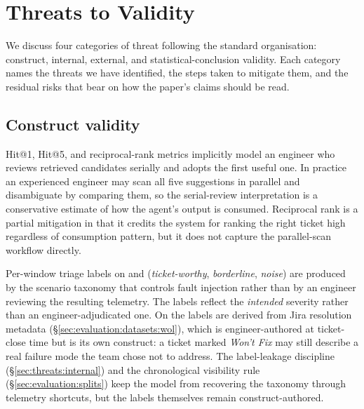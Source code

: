 
\section{Threats to Validity}
\label{sec:threats}

We discuss four categories of threat following the standard organisation: construct, internal, external, and statistical-conclusion validity. Each category names the threats we have identified, the steps taken to mitigate them, and the residual risks that bear on how the paper's claims should be read.

\subsection{Construct validity}
\label{sec:threats:construct}

 Hit@1, Hit@5, and reciprocal-rank metrics implicitly model an engineer who reviews retrieved candidates serially and adopts the first useful one. In practice an experienced engineer may scan all five suggestions in parallel and disambiguate by comparing them, so the serial-review interpretation is a conservative estimate of how the agent's output is consumed. Reciprocal rank is a partial mitigation in that it credits the system for ranking the right ticket high regardless of consumption pattern, but it does not capture the parallel-scan workflow directly.

 Per-window triage labels on \dsob{} and \dsotel{} (\emph{ticket-worthy}, \emph{borderline}, \emph{noise}) are produced by the scenario taxonomy that controls fault injection rather than by an engineer reviewing the resulting telemetry. The labels reflect the \emph{intended} severity rather than an engineer-adjudicated one. On \dswol{} the labels are derived from Jira resolution metadata (\S\ref{sec:evaluation:datasets:wol}), which is engineer-authored at ticket-close time but is its own construct: a ticket marked \emph{Won't Fix} may still describe a real failure mode the team chose not to address. The label-leakage discipline (\S\ref{sec:threats:internal}) and the chronological visibility rule (\S\ref{sec:evaluation:splits}) keep the model from recovering the taxonomy through telemetry shortcuts, but the labels themselves remain construct-authored.


